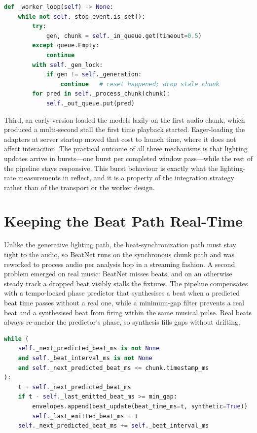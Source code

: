 \begin{lstlisting}[language=Python,caption={Worker-thread ingest. The generation guard discards chunks enqueued before a session reset.},label={lst:skip-worker}]
def _worker_loop(self) -> None:
    while not self._stop_event.is_set():
        try:
            gen, chunk = self._in_queue.get(timeout=0.5)
        except queue.Empty:
            continue
        with self._gen_lock:
            if gen != self._generation:
                continue   # reset happened; drop stale chunk
        for pred in self._process_chunk(chunk):
            self._out_queue.put(pred)
\end{lstlisting}

Third, an early version loaded the models lazily on the first audio chunk, which produced a multi-second stall the first time playback started. Eager-loading the adapters at server startup moved that cost to launch time, where it does not affect interaction. The practical outcome of all three mechanisms is that lighting updates arrive in bursts---one burst per completed window pass---while the rest of the pipeline stays responsive. This burst behaviour is exactly what the lighting-rate measurements in  reflect, and it is a property of the integration strategy rather than of the transport or the worker design.

\section{Keeping the Beat Path Real-Time}
\label{sec:impl-beat}

Unlike the generative lighting path, the beat-synchronization path must stay tight to the audio, so BeatNet runs on the synchronous chunk path and was reworked to process audio per analysis hop in a streaming fashion. A second problem emerged on real music: BeatNet misses beats, and on an otherwise steady track a dropped beat visibly stalls the fixtures. The pipeline compensates with a tempo-locked phase predictor that synthesises a beat when a predicted beat time passes without a real one, while a minimum-gap filter prevents a real beat and a synthesised beat from firing within the same musical pulse. Real beats always re-anchor the predictor's phase, so synthesis fills gaps without drifting.

\begin{lstlisting}[language=Python,caption={Tempo-locked synthesis: emit a predicted beat once its time has passed, gated so it cannot land on top of a recent real beat.},label={lst:beat-synth}]
while (
    self._next_predicted_beat_ms is not None
    and self._beat_interval_ms is not None
    and self._next_predicted_beat_ms <= chunk.timestamp_ms
):
    t = self._next_predicted_beat_ms
    if t - self._last_emitted_beat_ms >= min_gap:
        envelopes.append(beat_update(beat_time_ms=t, synthetic=True))
        self._last_emitted_beat_ms = t
    self._next_predicted_beat_ms += self._beat_interval_ms
\end{lstlisting}

